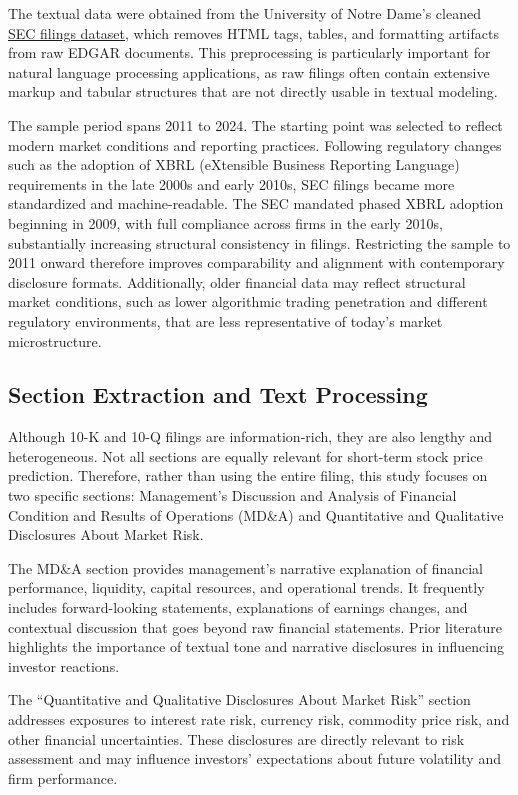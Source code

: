 The textual data were obtained from the University of Notre Dame's cleaned \href{https://sraf.nd.edu/sec-edgar-data/}{SEC filings dataset}, which removes HTML tags, tables, and formatting artifacts from raw EDGAR documents. 
This preprocessing is particularly important for natural language processing applications, as raw filings often contain extensive markup and tabular structures that are not directly usable in textual modeling.

The sample period spans 2011 to 2024. 
The starting point was selected to reflect modern market conditions and reporting practices. 
Following regulatory changes such as the adoption of XBRL (eXtensible Business Reporting Language) requirements in the late 2000s and early 2010s, SEC filings became more standardized and machine-readable. 
The SEC mandated phased XBRL adoption beginning in 2009, with full compliance across firms in the early 2010s, substantially increasing structural consistency in filings. 
Restricting the sample to 2011 onward therefore improves comparability and alignment with contemporary disclosure formats. 
Additionally, older financial data may reflect structural market conditions, such as lower algorithmic trading penetration and different regulatory environments, that are less representative of today's market microstructure.

\subsection{Section Extraction and Text Processing}

Although 10-K and 10-Q filings are information-rich, they are also lengthy and heterogeneous.
Not all sections are equally relevant for short-term stock price prediction. 
Therefore, rather than using the entire filing, this study focuses on two specific sections: 
Management's Discussion and Analysis of Financial Condition and Results of Operations (MD\&A) and Quantitative and Qualitative Disclosures About Market Risk.

The MD\&A section provides management's narrative explanation of financial performance, liquidity, capital resources, and operational trends. 
It frequently includes forward-looking statements, explanations of earnings changes, and contextual discussion that goes beyond raw financial statements. 
Prior literature highlights the importance of textual tone and narrative disclosures in influencing investor reactions.

The “Quantitative and Qualitative Disclosures About Market Risk” section addresses exposures to interest rate risk, currency risk, commodity price risk, and other financial uncertainties. 
These disclosures are directly relevant to risk assessment and may influence investors' expectations about future volatility and firm performance.

